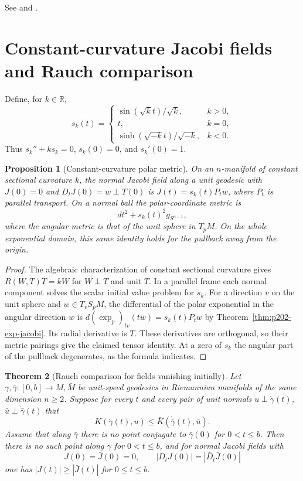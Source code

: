 \documentclass[11pt,oneside,openany]{book}
\theoremstyle{plain}
\newtheorem{theorem}{Theorem}[chapter]
\newtheorem{proposition}[theorem]{Proposition}
\theoremstyle{definition}
\theoremstyle{remark}
\begin{document}
See \cite[Chapter 10, Section on cut points]{LeeRM} and
\cite[Chapter 13, Section 2]{dC}.

\section{Constant-curvature Jacobi fields and Rauch comparison}
\label{p202:G20}

Define, for \(k\in\mathbb R\),
\[
 s_k(t)=
 \begin{cases}
 \sin(\sqrt{k}t)/\sqrt{k},& k>0,\\
 t,& k=0,\\
 \sinh(\sqrt{-k}t)/\sqrt{-k},& k<0.
 \end{cases}
\]
Thus \(s_k''+k s_k=0\), \(s_k(0)=0\), and \(s_k'(0)=1\).

\begin{proposition}[Constant-curvature polar metric]\label{prop:p202-model-polar}
On an \(n\)-manifold of constant sectional curvature \(k\),
the normal Jacobi field along a unit geodesic with
\(J(0)=0\) and \(D_tJ(0)=w\perp T(0)\) is
\(J(t)=s_k(t)P_t w\), where \(P_t\) is parallel transport.
On a normal ball the polar-coordinate metric is
\[
 dt^2+s_k(t)^2g_{S^{n-1}},
\]
where the angular metric is that of the unit sphere in \(T_pM\).
On the whole exponential domain, this same identity holds for
the pullback away from the origin.
\end{proposition}

\begin{proof}
The algebraic characterization of constant sectional curvature
gives \(R(W,T)T=kW\) for \(W\perp T\) and unit \(T\).
In a parallel frame each normal component solves the scalar
initial value problem for \(s_k\). For a direction \(v\) on the
unit sphere and \(w\in T_v S_pM\), the differential of the polar
exponential in the angular direction \(w\) is
\(d(\exp_p)_{tv}(tw)=s_k(t)P_t w\) by
Theorem~\ref{thm:p202-exp-jacobi}. Its radial derivative is \(T\).
These derivatives are orthogonal, so their metric pairings give
the claimed tensor identity. At a zero of \(s_k\) the angular
part of the pullback degenerates, as the formula indicates.
\end{proof}

\begin{theorem}[Rauch comparison for fields vanishing initially]
\label{thm:p202-rauch}
Let \(\gamma,\bar\gamma:[0,b]\to M,\bar M\) be unit-speed
geodesics in Riemannian manifolds of the same dimension \(n\ge2\).
Suppose for every \(t\) and every pair of unit normals
\(u\perp\dot\gamma(t)\), \(\bar u\perp\dot{\bar\gamma}(t)\) that
\[
 K(\dot\gamma(t),u)\le
 \bar K(\dot{\bar\gamma}(t),\bar u).
\]
Assume that along \(\bar\gamma\) there is no point conjugate to
\(\bar\gamma(0)\) for \(0<t\le b\). Then there is no such point
along \(\gamma\) for \(0<t\le b\), and for normal Jacobi fields
with
\[
 J(0)=\bar J(0)=0,\qquad
 |D_tJ(0)|=|\bar D_t\bar J(0)|
\]
one has \(|J(t)|\ge|\bar J(t)|\) for \(0\le t\le b\).
\end{theorem}
\end{document}
